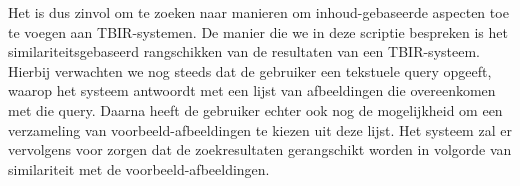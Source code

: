 Het is dus zinvol om te zoeken naar manieren om inhoud-gebaseerde aspecten toe te voegen aan
TBIR-systemen. De manier die we in deze scriptie bespreken is het 
similariteitsgebaseerd rangschikken van de resultaten van een TBIR-systeem. Hierbij verwachten we
nog steeds dat de gebruiker een tekstuele query opgeeft, waarop het systeem antwoordt met een 
lijst van afbeeldingen die overeenkomen met die query. Daarna heeft de gebruiker echter ook nog 
de mogelijkheid om een verzameling van voorbeeld-afbeeldingen te kiezen uit deze lijst. Het 
systeem zal er vervolgens voor zorgen dat de zoekresultaten gerangschikt worden in 
volgorde van similariteit met de voorbeeld-afbeeldingen.

